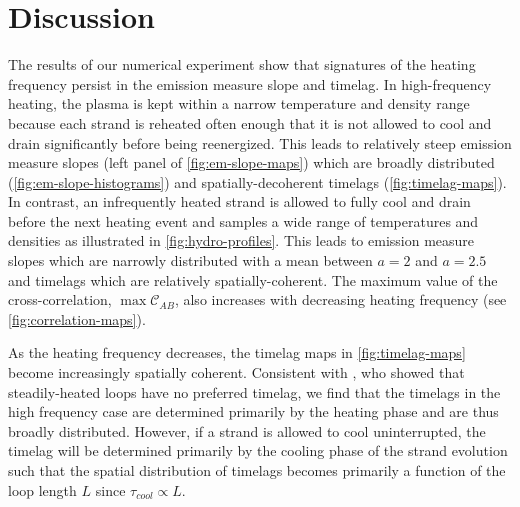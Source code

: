 
\section{Discussion}\label{discussion}

The results of our numerical experiment show that signatures of the heating frequency persist in the emission measure slope and timelag. In high-frequency heating, the plasma is kept within a narrow temperature and density range because each strand is reheated often enough that it is not allowed to cool and drain significantly before being reenergized. This leads to relatively steep emission measure slopes (left panel of \autoref{fig:em-slope-maps}) which are broadly distributed (\autoref{fig:em-slope-histograms}) and spatially-decoherent timelags (\autoref{fig:timelag-maps}). In contrast, an infrequently heated strand is allowed to fully cool and drain before the next heating event and samples a wide range of temperatures and densities as illustrated in \autoref{fig:hydro-profiles}. This leads to emission measure slopes which are narrowly distributed with a mean between $a=2$ and $a=2.5$ and timelags which are relatively spatially-coherent. The maximum value of the cross-correlation, $\max\mathcal{C}_{AB}$, also increases with decreasing heating frequency (see \autoref{fig:correlation-maps}).

As the heating frequency decreases, the timelag maps in \autoref{fig:timelag-maps} become increasingly spatially coherent. Consistent with \citet{viall_signatures_2016}, who showed that steadily-heated loops have no preferred timelag, we find that the timelags in the high frequency case are determined primarily by the heating phase and are thus broadly distributed. However, if a strand is allowed to cool uninterrupted, the timelag will be determined primarily by the cooling phase of the strand evolution such that the spatial distribution of timelags becomes primarily a function of the loop length $L$ since $\tau_{cool}\propto L$.

